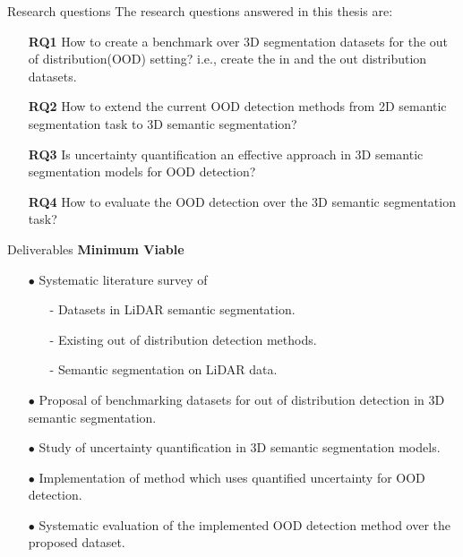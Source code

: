 \documentclass[aspectratio=169]{beamer}
\begin{document}
\begin{frame}{Research questions}
    The research questions answered in this thesis are:
    \begin{itemize}
        \item[\textbf{RQ1}] How to create a benchmark over 3D segmentation datasets for the out of distribution(OOD) setting? i.e., create the in and the out distribution datasets.
        \item[\textbf{RQ2}] How to extend the current OOD detection methods from 2D semantic segmentation task to 3D semantic segmentation?
        \item[\textbf{RQ3}] Is uncertainty quantification an effective approach in 3D semantic segmentation models for OOD detection?
        \item[\textbf{RQ4}] How to evaluate the OOD detection over the 3D semantic segmentation task?
    \end{itemize}
\end{frame}
\begin{frame}{Deliverables}
    \textbf{Minimum Viable}
            \begin{itemize}
                \item[$\bullet$] Systematic literature survey of
                    \begin{itemize}
                        \item[-] Datasets in LiDAR semantic segmentation.
                        \item[-] Existing out of distribution detection methods.
                        \item[-] Semantic segmentation on LiDAR data.
                    \end{itemize}
                \item[$\bullet$] Proposal of benchmarking datasets for out of distribution detection in 3D semantic segmentation.
                \item[$\bullet$] Study of uncertainty quantification in 3D semantic segmentation models.
                \item[$\bullet$] Implementation of method which uses quantified uncertainty for OOD detection.
                \item[$\bullet$] Systematic evaluation of the implemented OOD detection method over the proposed dataset.
                  
            \end{itemize}
\end{frame}
\end{document}
